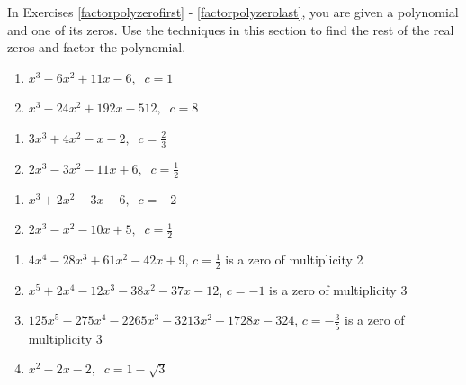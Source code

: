 \newpage

In Exercises \ref{factorpolyzerofirst} - \ref{factorpolyzerolast}, you are given a polynomial and one of its zeros.  Use the techniques in this section to find the rest of the real zeros and factor the polynomial.  

\begin{multicols}{2}
\begin{enumerate}
\setcounter{enumi}{\value{HW}}

\item $x^{3} - 6x^{2} + 11x - 6, \;\; c = 1$ \label{factorpolyzerofirst}
\item $x^{3} - 24x^{2} + 192x - 512, \;\; c = 8$

\setcounter{HW}{\value{enumi}}
\end{enumerate}
\end{multicols}

\begin{multicols}{2}
\begin{enumerate}
\setcounter{enumi}{\value{HW}}

\item $3x^{3} + 4x^{2} - x - 2, \;\; c = \frac{2}{3}$
\item $2x^3-3x^2-11x+6, \;\; c=\frac{1}{2}$

\setcounter{HW}{\value{enumi}}
\end{enumerate}
\end{multicols}

\begin{multicols}{2}
\begin{enumerate}
\setcounter{enumi}{\value{HW}}

\item $x^3+2x^2-3x-6, \;\; c = -2$
\item $2x^3-x^2-10x+5, \;\; c=\frac{1}{2}$

\setcounter{HW}{\value{enumi}}
\end{enumerate}
\end{multicols}


\begin{enumerate}
\setcounter{enumi}{\value{HW}}

\item $4x^{4} - 28x^{3} + 61x^{2} - 42x + 9$, $c = \frac{1}{2}$ is a zero of multiplicity 2 

\item  $x^5+2x^4-12x^3-38x^2-37x-12$, $c=-1$ is a zero of multiplicity 3

\item $125x^{5} - 275x^{4} - 2265x^{3} - 3213x^{2} - 1728x - 324$, $c = -\frac{3}{5}$ is a zero of multiplicity 3

\item $x^{2} - 2x - 2, \;\; c = 1 - \sqrt{3}$ \label{factorpolyzerolast}

\setcounter{HW}{\value{enumi}}
\end{enumerate}


